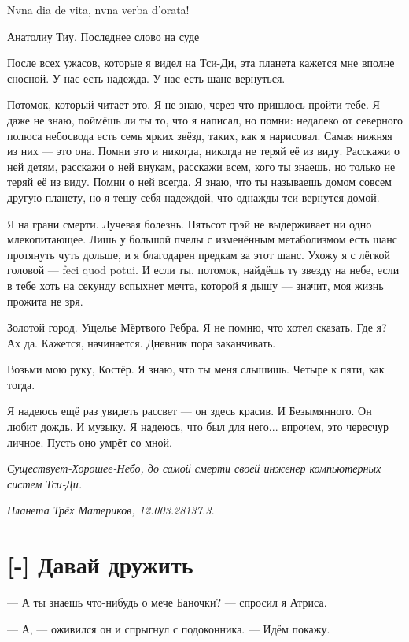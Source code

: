 \epigraph
{Nvna dia de vita, nvna verba d'orata\FM!}
{Анатолиу Тиу.
Последнее слово на суде}

\textspace

После всех ужасов, которые я видел на Тси-Ди, эта планета кажется мне вполне сносной.
У нас есть надежда.
У нас есть шанс вернуться.

Потомок, который читает это.
Я не знаю, через что пришлось пройти тебе.
Я даже не знаю, поймёшь ли ты то, что я написал, но помни: недалеко от северного полюса небосвода есть семь ярких звёзд, таких, как я нарисовал.
Самая нижняя из них --- это она.
Помни это и никогда, никогда не теряй её из виду.
Расскажи о ней детям, расскажи о ней внукам, расскажи всем, кого ты знаешь, но только не теряй её из виду.
Помни о ней всегда.
Я знаю, что ты называешь домом совсем другую планету, но я тешу себя надеждой, что однажды тси вернутся домой.

Я на грани смерти.
Лучевая болезнь.
Пятьсот грэй не выдерживает ни одно млекопитающее.
Лишь у большой пчелы с изменённым метаболизмом есть шанс протянуть чуть дольше, и я благодарен предкам за этот шанс.
Ухожу я с лёгкой головой --- feci quod potui.
И если ты, потомок, найдёшь ту звезду на небе, если в тебе хоть на секунду вспыхнет мечта, которой я дышу --- значит, моя жизнь прожита не зря.

Золотой город.
Ущелье Мёртвого Ребра.
Я не помню, что хотел сказать.
Где я?
Ах да.
Кажется, начинается.
Дневник пора заканчивать.

Возьми мою руку, Костёр.
Я знаю, что ты меня слышишь.
Четыре к пяти, как тогда.

Я надеюсь ещё раз увидеть рассвет --- он здесь красив.
И Безымянного.
Он любит дождь.
И музыку.
Я надеюсь, что был для него... впрочем, это чересчур личное.
Пусть оно умрёт со мной.

\emph{Существует-Хорошее-Небо, до самой смерти своей инженер компьютерных систем Тси-Ди.}

\emph{Планета Трёх Материков, 12.003.28137.3.}

\section{[-] Давай дружить}

\textspace

--- А ты знаешь что-нибудь о мече Баночки? --- спросил я Атриса.

--- А, --- оживился он и спрыгнул с подоконника.
--- Идём покажу.


